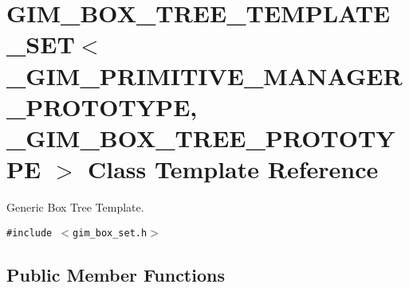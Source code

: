 \hypertarget{class_g_i_m___b_o_x___t_r_e_e___t_e_m_p_l_a_t_e___s_e_t}{
\section{GIM\_\-BOX\_\-TREE\_\-TEMPLATE\_\-SET$<$ \_\-GIM\_\-PRIMITIVE\_\-MANAGER\_\-PROTOTYPE, \_\-GIM\_\-BOX\_\-TREE\_\-PROTOTYPE $>$ Class Template Reference}
\label{class_g_i_m___b_o_x___t_r_e_e___t_e_m_p_l_a_t_e___s_e_t}
}
Generic Box Tree Template.  


{\tt \#include $<$gim\_\-box\_\-set.h$>$}

\subsection*{Public Member Functions}
